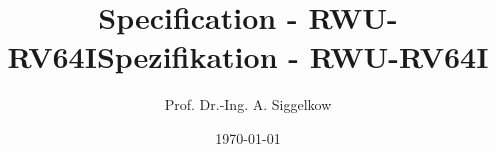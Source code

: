 \documentclass[a4paper,12pt]{book}
\newcommand{\TEXTa}{./}
\newcommand{\aschip}{RWU-RV64I}
\begin{document}
{\title{Specification - \aschip}}
{\title{Spezifikation - \aschip}}
\author{Prof. Dr.-Ing. A. Siggelkow}
\date{\today}
\begin{titlepage}
  \maketitle
  \thispagestyle{empty}
\end{titlepage}
\thispagestyle{empty}
\newpage
\setcounter{chapter}{0}
%

\printbibliography
\end{document}
